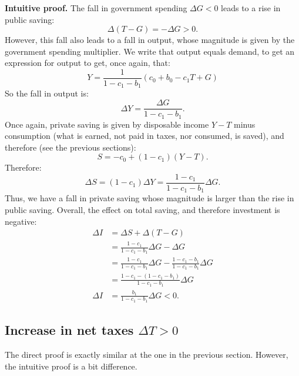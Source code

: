 \documentclass[]{book}
\theoremstyle{definition}
\theoremstyle{definition}
\theoremstyle{definition}
\theoremstyle{remark}
\begin{document}
\textbf{Intuitive proof.} The fall in government spending \(\Delta G<0\)
leads to a rise in public saving: \[\Delta(T-G)=-\Delta G>0.\] However,
this fall also leads to a fall in output, whose magnitude is given by
the government spending multiplier. We write that output equals demand,
to get an expression for output to get, once again, that:
\[Y=\frac{1}{1-c_{1}-b_{1}}\left(c_{0}+b_{0}-c_{1}T+G\right)\] So the
fall in output is: \[\Delta Y=\frac{\Delta G}{1-c_{1}-b_{1}}.\] Once
again, private saving is given by disposable income \(Y-T\) minus
consumption (what is earned, not paid in taxes, nor consumed, is saved),
and therefore (see the previous sections):
\[S=-c_{0}+\left(1-c_{1}\right)\left(Y-T\right).\] Therefore:
\[\Delta S=(1-c_{1})\Delta Y=\frac{1-c_{1}}{1-c_{1}-b_{1}}\Delta G.\]
Thus, we have a fall in private saving whose magnitude is larger than
the rise in public saving. Overall, the effect on total saving, and
therefore investment is negative: \[
\begin{aligned}
\Delta I    &=\Delta S+\Delta(T-G)\\
&=\frac{1-c_{1}}{1-c_{1}-b_{1}}\Delta G-\Delta G\\
&=\frac{1-c_{1}}{1-c_{1}-b_{1}}\Delta G-\frac{1-c_{1}-b_{1}}{1-c_{1}-b_{1}}\Delta G\\
&=\frac{1-c_{1}-(1-c_{1}-b_{1})}{1-c_{1}-b_{1}}\Delta G\\
\Delta I &=\frac{b_{1}}{1-c_{1}-b_{1}}\Delta G<0.
\end{aligned}
\]

\subsection{\texorpdfstring{Increase in net taxes
\(\Delta T>0\)}{Increase in net taxes \textbackslash{}Delta T\textgreater{}0}}\label{increase-in-net-taxes-delta-t0-1}

The direct proof is exactly similar at the one in the previous section.
However, the intuitive proof is a bit difference.
\end{document}
